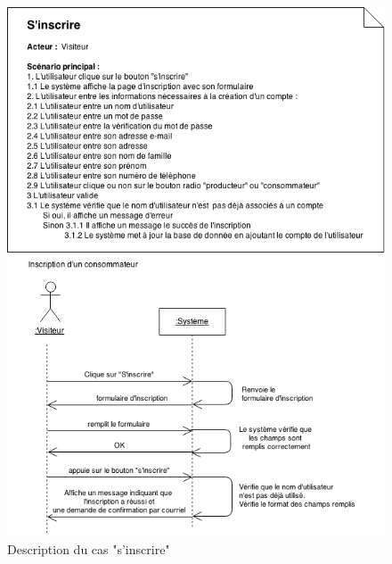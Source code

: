 \documentclass[12pt]{report}
\begin{document}
\begin{figure}[!H]
\centering
\includegraphics[width=1.\textwidth]{./ressources/desc_UC_inscrire.png}
\caption{Description du cas "s'inscrire"}
\end{figure}
\end{document}
